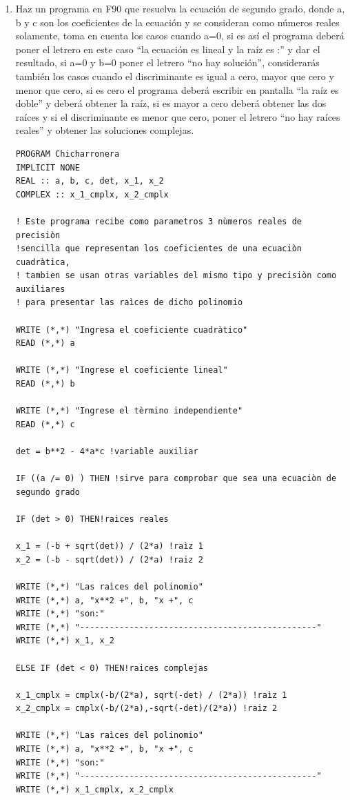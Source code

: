 \documentclass[12pt,a4paper]{article}
\begin{document}
\begin{enumerate}
    \item Haz un programa en F90 que resuelva la ecuación de segundo grado, donde a, b y c son los coeficientes de la ecuación y se consideran como números reales solamente, toma en cuenta los casos cuando a=0, si es así el programa deberá poner el letrero en este caso “la ecuación es lineal y la raíz es :” y dar el resultado, si a=0 y b=0 poner el letrero “no hay solución”, considerarás también los casos cuando el discriminante es igual a cero, mayor que cero y menor que cero, si es cero el programa deberá escribir en pantalla “la raíz es doble” y deberá obtener la raíz, si es mayor a cero deberá obtener las dos raíces y si el discriminante es menor que cero, poner el letrero “no hay raíces reales” y obtener las soluciones complejas.
    
    \begin{verbatim}
PROGRAM Chicharronera
IMPLICIT NONE 
REAL :: a, b, c, det, x_1, x_2
COMPLEX :: x_1_cmplx, x_2_cmplx

! Este programa recibe como parametros 3 nùmeros reales de precisiòn
!sencilla que representan los coeficientes de una ecuaciòn cuadràtica,
! tambien se usan otras variables del mismo tipo y precisiòn como auxiliares
! para presentar las raìces de dicho polinomio

WRITE (*,*) "Ingresa el coeficiente cuadràtico"
READ (*,*) a
		
WRITE (*,*) "Ingrese el coeficiente lineal"
READ (*,*) b

WRITE (*,*) "Ingrese el tèrmino independiente"
READ (*,*) c

det = b**2 - 4*a*c !variable auxiliar

IF ((a /= 0) ) THEN !sirve para comprobar que sea una ecuaciòn de segundo grado

IF (det > 0) THEN!raices reales
			
x_1 = (-b + sqrt(det)) / (2*a) !raìz 1
x_2 = (-b - sqrt(det)) / (2*a) !raiz 2	

WRITE (*,*) "Las raìces del polinomio"
WRITE (*,*) a, "x**2 +", b, "x +", c
WRITE (*,*) "son:"
WRITE (*,*) "------------------------------------------------"
WRITE (*,*) x_1, x_2	

ELSE IF (det < 0) THEN!raices complejas

x_1_cmplx = cmplx(-b/(2*a), sqrt(-det) / (2*a)) !raìz 1
x_2_cmplx = cmplx(-b/(2*a),-sqrt(-det)/(2*a)) !raiz 2

WRITE (*,*) "Las raìces del polinomio"
WRITE (*,*) a, "x**2 +", b, "x +", c
WRITE (*,*) "son:"
WRITE (*,*) "------------------------------------------------"
WRITE (*,*) x_1_cmplx, x_2_cmplx
	

\end{verbatim}
\end{enumerate}
\end{document}
